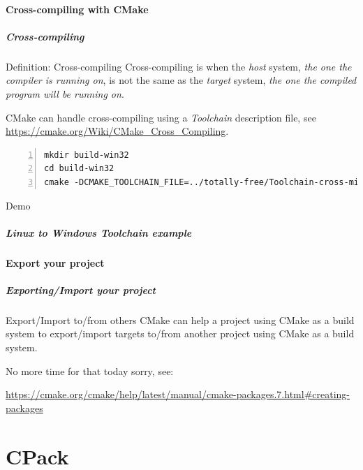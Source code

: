 \documentclass[compress,slidestop,table,usepdftitle=false
              ]
               {beamer}
\begin{document}
\subsection{Cross-compiling with CMake}
\begin{frame}[fragile]
\frametitle{Cross-compiling}
\begin{block}{Definition: Cross-compiling}
Cross-compiling is when the \emph{host} system,
\textsl{the one the compiler is running on},
is not the same as the \emph{target} system,
\textsl{the one the compiled program will be running on}.
\end{block}
CMake can handle cross-compiling using a \emph{Toolchain} description file,
see \url{https://cmake.org/Wiki/CMake_Cross_Compiling}.
\begin{Verbatim}[fontsize=\tiny,numbers=left]
mkdir build-win32
cd build-win32
cmake -DCMAKE_TOOLCHAIN_FILE=../totally-free/Toolchain-cross-mingw32-linux.cmake ../totally-free/
\end{Verbatim}
\begin{center}
{\Large
\alert{Demo}
}
\end{center}

\end{frame}

\begin{frame}[fragile]
  \frametitle{Linux to Windows Toolchain example}
  
\end{frame}

\subsection{Export your project}
\begin{frame}
\frametitle{Exporting/Import your project}

\begin{block}{Export/Import to/from others}
CMake can help a project using CMake as a build system to
export/import targets to/from another project using CMake
as a build system.
\end{block}

No more time for that today sorry, see:

\url{https://cmake.org/cmake/help/latest/manual/cmake-packages.7.html\#creating-packages}
\end{frame}

\part{CPack}
\end{document}
